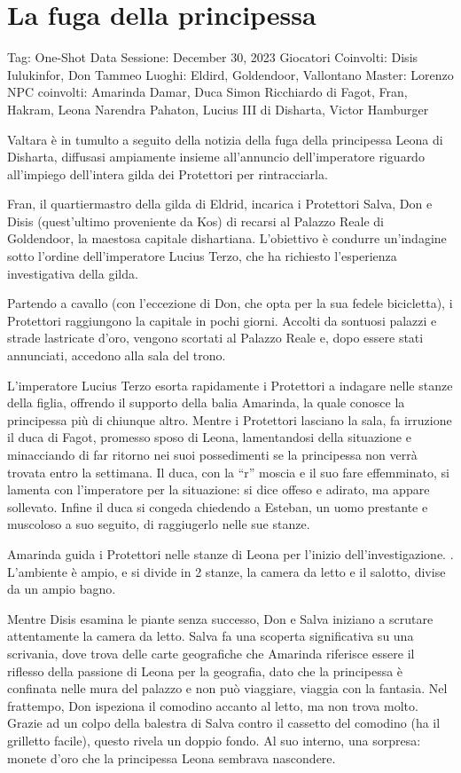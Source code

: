\section{La fuga della principessa}\label{la-fuga-della-principessa}

Tag: One-Shot Data Sessione: December 30, 2023 Giocatori Coinvolti:
Disis Iulukinfor, Don Tammeo Luoghi: Eldird, Goldendoor, Vallontano
Master: Lorenzo NPC coinvolti: Amarinda Damar, Duca Simon Ricchiardo di
Fagot, Fran, Hakram, Leona Narendra Pahaton, Lucius III di Disharta,
Victor Hamburger

Valtara è in tumulto a seguito della notizia della fuga della
principessa Leona di Disharta, diffusasi ampiamente insieme all'annuncio
dell'imperatore riguardo all'impiego dell'intera gilda dei Protettori
per rintracciarla.

Fran, il quartiermastro della gilda di Eldrid, incarica i Protettori
Salva, Don e Disis (quest'ultimo proveniente da Kos) di recarsi al
Palazzo Reale di Goldendoor, la maestosa capitale dishartiana.
L'obiettivo è condurre un'indagine sotto l'ordine dell'imperatore Lucius
Terzo, che ha richiesto l'esperienza investigativa della gilda.

Partendo a cavallo (con l'eccezione di Don, che opta per la sua fedele
bicicletta), i Protettori raggiungono la capitale in pochi giorni.
Accolti da sontuosi palazzi e strade lastricate d'oro, vengono scortati
al Palazzo Reale e, dopo essere stati annunciati, accedono alla sala del
trono.

L'imperatore Lucius Terzo esorta rapidamente i Protettori a indagare
nelle stanze della figlia, offrendo il supporto della balia Amarinda, la
quale conosce la principessa più di chiunque altro. Mentre i Protettori
lasciano la sala, fa irruzione il duca di Fagot, promesso sposo di
Leona, lamentandosi della situazione e minacciando di far ritorno nei
suoi possedimenti se la principessa non verrà trovata entro la
settimana. Il duca, con la ``r'' moscia e il suo fare effemminato, si
lamenta con l'imperatore per la situazione: si dice offeso e adirato, ma
appare sollevato. Infine il duca si congeda chiedendo a Esteban, un uomo
prestante e muscoloso a suo seguito, di raggiugerlo nelle sue stanze.

Amarinda guida i Protettori nelle stanze di Leona per l'inizio
dell'investigazione. . L'ambiente è ampio, e si divide in 2 stanze, la
camera da letto e il salotto, divise da un ampio bagno.

Mentre Disis esamina le piante senza successo, Don e Salva iniziano a
scrutare attentamente la camera da letto. Salva fa una scoperta
significativa su una scrivania, dove trova delle carte geografiche che
Amarinda riferisce essere il riflesso della passione di Leona per la
geografia, dato che la principessa è confinata nelle mura del palazzo e
non può viaggiare, viaggia con la fantasia. Nel frattempo, Don ispeziona
il comodino accanto al letto, ma non trova molto. Grazie ad un colpo
della balestra di Salva contro il cassetto del comodino (ha il grilletto
facile), questo rivela un doppio fondo. Al suo interno, una sorpresa:
monete d'oro che la principessa Leona sembrava nascondere.

